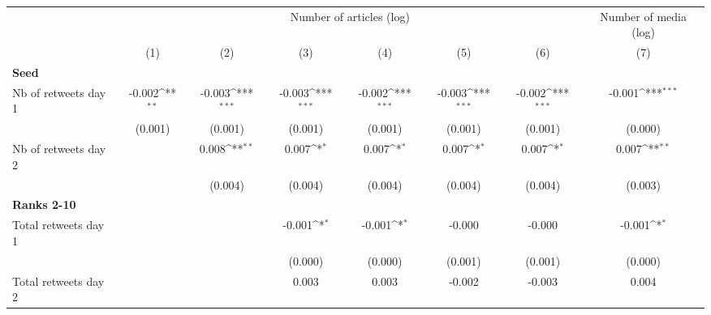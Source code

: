 {
\def\sym#1{\ifmmode^{#1}\else\(^{#1}\)\fi}
\begin{tabular}{l*{7}{c}}
\hline\hline
                    &\multicolumn{6}{c}{Number of articles (log)}                                                                                       &\multicolumn{1}{c}{Number of media (log)}\\\cmidrule(lr){2-7}\cmidrule(lr){8-8}
                    &\multicolumn{1}{c}{(1)}         &\multicolumn{1}{c}{(2)}         &\multicolumn{1}{c}{(3)}         &\multicolumn{1}{c}{(4)}         &\multicolumn{1}{c}{(5)}         &\multicolumn{1}{c}{(6)}         &\multicolumn{1}{c}{(7)}         \\
\hline
\textbf{Seed}       &                     &                     &                     &                     &                     &                     &                     \\
Nb of retweets day 1&      -0.002\sym{**} &      -0.003\sym{***}&      -0.003\sym{***}&      -0.002\sym{***}&      -0.003\sym{***}&      -0.002\sym{***}&      -0.001\sym{***}\\
                    &     (0.001)         &     (0.001)         &     (0.001)         &     (0.001)         &     (0.001)         &     (0.001)         &     (0.000)         \\
Nb of retweets day 2&                     &       0.008\sym{**} &       0.007\sym{*}  &       0.007\sym{*}  &       0.007\sym{*}  &       0.007\sym{*}  &       0.007\sym{**} \\
                    &                     &     (0.004)         &     (0.004)         &     (0.004)         &     (0.004)         &     (0.004)         &     (0.003)         \\
\textbf{Ranks 2-10} &                     &                     &                     &                     &                     &                     &                     \\
Total retweets day 1&                     &                     &      -0.001\sym{*}  &      -0.001\sym{*}  &      -0.000         &      -0.000         &      -0.001\sym{*}  \\
                    &                     &                     &     (0.000)         &     (0.000)         &     (0.001)         &     (0.001)         &     (0.000)         \\
Total retweets day 2&                     &                     &       0.003         &       0.003         &      -0.002         &      -0.003         &       0.004         \\

\end{tabular}}
